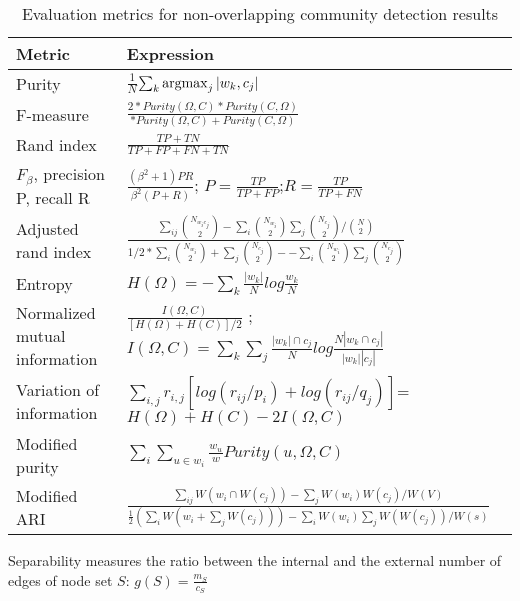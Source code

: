 \begin{table}
	\centering
	\begin{tabular}{|l|l|} \hline
		\textbf{Metric} &  \textbf{Expression}    \\ \hline
		
		Purity& $\frac{1}{N}$$\sum_{k} \operatorname*{argmax}_{j} |w_{k},c_{j}|$  \\ \hline 
		F-measure & $\frac{2*Purity(\Omega,C)*Purity(C,\Omega)}{*Purity(\Omega,C)+Purity(C,\Omega)}$ \\ \hline 
		Rand index& $\frac{TP+TN}{TP+FP+FN+TN}$ \\ \hline 
		$F_{\beta}$, precision P, recall R& $\frac{(\beta^{2}+1)PR}{\beta^{2}(P+R)} $; $P = \frac{TP}{TP+FP}$;$R = \frac{TP}{TP+FN}$ \\ \hline  
		Adjusted rand index & $\frac{\sum_{ij}\binom{N_{w_{i}c_{j}}}{2} -\sum_{i}\binom{N_{w_{i}}}{2} \sum_{j}\binom{N_{c_{j}}}{2}/\binom{N}{2}}{1/2*\sum_{i}\binom{N_{w_{i}}}{2}+\sum_{j}\binom{N_{c_{j}}}{2}--\sum_{i}\binom{N_{w_{i}}}{2} \sum_{j}\binom{N_{c_{j}}}{2}} $  \\ \hline 
		Entropy& $H(\Omega) = - \sum_{k} \frac{|w_{k}|}{N}log \frac{w_{k}}{N}$ \\ \hline 
		Normalized mutual information & $ \frac{I(\Omega,C)}{[H(\Omega)+H(C)]/2}$ ; $I(\Omega,C) = \sum_{k}\sum_{j}\frac{|w_{k}| \cap c_{j}}{N} log \frac{N|w_{k} \cap c_{j}|}{|w_{k}||c_{j}|}$ \\ \hline 
		Variation of information& $ \sum_{i,j} r_{i,j}[log(r_{ij}/p_{i}) + log(r_{ij}/q_{j})]$= $H(\Omega) + H(C)-2I(\Omega,C)$ \\ \hline 
		Modified purity& $\sum_{i}\sum_{u \in w_{i}} \frac{w_{u}}{w}Purity(u,\Omega,C) $\\ \hline 
		Modified ARI& $\frac{\sum_{ij}W(w_{i} \cap W(c_{j})) - \sum_{j}W(w_{i})W(c_{j})/W(V)}{\frac{1}{2}(\sum_{i}W(w_{i}+\sum_{j}W(c_{j}))) - \sum_{i}W(w_{i})\sum_{j}W(W(c_{j}))/W(s)}$\\ \hline 
	\end{tabular}
	\caption{Evaluation metrics for non-overlapping community detection results}
	\label{tab:non-overlapping-metric}
	
\end{table} 

Separability measures the ratio between the internal and the external number of edges of  node set $S$: $g(S) = \frac{m_S}{c_S}$

